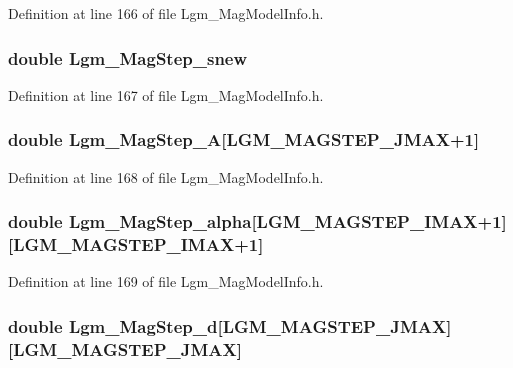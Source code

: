 Definition at line 166 of file Lgm\_\-MagModelInfo.h.\hypertarget{struct_lgm___mag_model_info_289830ee3ee42ca423ae557a9417fb90}{
\subsubsection[{Lgm\_\-MagStep\_\-snew}]{\setlength{\rightskip}{0pt plus 5cm}double {\bf Lgm\_\-MagStep\_\-snew}}}
\label{struct_lgm___mag_model_info_289830ee3ee42ca423ae557a9417fb90}




Definition at line 167 of file Lgm\_\-MagModelInfo.h.\hypertarget{struct_lgm___mag_model_info_33ce6893a0952ee0bcf577a9f9f802ff}{
\subsubsection[{Lgm\_\-MagStep\_\-A}]{\setlength{\rightskip}{0pt plus 5cm}double {\bf Lgm\_\-MagStep\_\-A}\mbox{[}LGM\_\-MAGSTEP\_\-JMAX+1\mbox{]}}}
\label{struct_lgm___mag_model_info_33ce6893a0952ee0bcf577a9f9f802ff}




Definition at line 168 of file Lgm\_\-MagModelInfo.h.\hypertarget{struct_lgm___mag_model_info_62bf5ca4d843811f15f1592223b72c79}{
\subsubsection[{Lgm\_\-MagStep\_\-alpha}]{\setlength{\rightskip}{0pt plus 5cm}double {\bf Lgm\_\-MagStep\_\-alpha}\mbox{[}LGM\_\-MAGSTEP\_\-IMAX+1\mbox{]}\mbox{[}LGM\_\-MAGSTEP\_\-IMAX+1\mbox{]}}}
\label{struct_lgm___mag_model_info_62bf5ca4d843811f15f1592223b72c79}




Definition at line 169 of file Lgm\_\-MagModelInfo.h.\hypertarget{struct_lgm___mag_model_info_7e69c8ba64e1329002344adc94aa6594}{
\subsubsection[{Lgm\_\-MagStep\_\-d}]{\setlength{\rightskip}{0pt plus 5cm}double {\bf Lgm\_\-MagStep\_\-d}\mbox{[}LGM\_\-MAGSTEP\_\-JMAX\mbox{]}\mbox{[}LGM\_\-MAGSTEP\_\-JMAX\mbox{]}}}
\label{struct_lgm___mag_model_info_7e69c8ba64e1329002344adc94aa6594}




